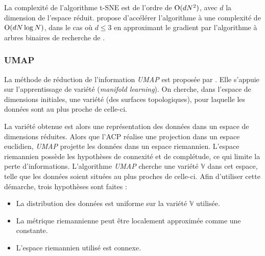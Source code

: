 La complexité de l'algorithme t-SNE est de l'ordre de $\operatorname{O}(d N^2)$, avec $d$ la dimension de l'espace réduit.
\cite{maaten_accelerating_2014} propose d'accélérer l'algorithme à une complexité de $\operatorname{O}(d N \log N)$, dans le cas où $d \le 3$ en approximant le gradient par l'algorithme à arbres binaires de recherche de \citeauthor{barnes_hierarchical_1986} \cite{barnes_hierarchical_1986}.

\subsubsection{UMAP} \label{subsubsec:umap}
La méthode de réduction de l'information \textit{UMAP} est proposée par \citeauthor{mcinnes_umap_2018} \cite{mcinnes_umap_2018, mcinnes_umap_2018a}.
Elle s'appuie sur l'apprentissage de variété (\textit{manifold learning}).
On cherche, dans l'espace de dimensions initiales, une variété (des surfaces topologiques), pour laquelle les données sont au plus proche de celle-ci.

La variété obtenue est alors une représentation des données dans un espace de dimensions réduites.
Alors que l'ACP réalise une projection dans un espace euclidien, \textit{UMAP} projette les données dans un espace riemannien.
L'espace riemannien possède les hypothèses de connexité et de complétude, ce qui limite la perte d'informations.
L'algorithme \textit{UMAP} cherche une variété $\mathbb{V}$ dans cet espace, telle que les données soient situées au plus proches de celle-ci.
Afin d'utiliser cette démarche, trois hypothèses sont faites :
\begin{itemize}
	\item La distribution des données est uniforme sur la variété $\mathbb{V}$ utilisée.
	\item La métrique riemannienne peut être localement approximée comme une constante.
	\item L'espace riemannien utilisé est connexe.
\end{itemize}

